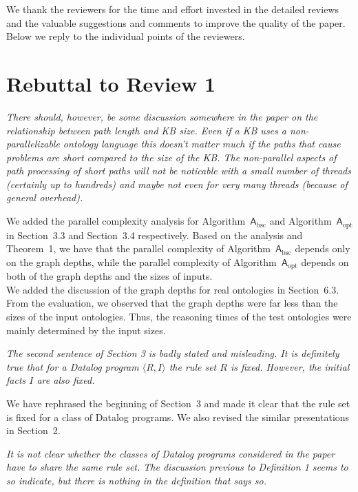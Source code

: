 \documentclass{article}
\let\quoteOld\quote
\let\endquoteOld\endquote
\renewenvironment{quote}{\quoteOld\itshape}{\endquoteOld}
\begin{document}
We thank the reviewers for the time and effort invested in the detailed reviews and the valuable suggestions and comments to improve the quality of the paper.  Below we reply to the individual points of the reviewers.


\section{Rebuttal to Review 1}

\begin{quote}
There should, however, be some discussion somewhere in the paper on the
relationship between path length and KB size.   Even if a KB uses a
non-parallelizable ontology language this doesn't matter much if the paths
that cause problems are short compared to the size of the KB.  The
non-parallel aspects of path processing of short paths will not be noticable
with a small number of threads (certainly up to hundreds) and maybe not even
for very many threads (because of general overhead).
\end{quote}

We added the parallel complexity analysis for Algorithm~$\mathsf{A}_{\text{bsc}}$
and Algorithm~$\mathsf{A}_{\text{opt}}$
in Section~3.3 and Section~3.4 respectively. 
Based on the analysis and Theorem~1, we have that the parallel complexity
of Algorithm~$\mathsf{A}_{\text{bsc}}$ depends only on the graph depths,
while the parallel complexity of Algorithm~$\mathsf{A}_{\text{opt}}$
depends on both of the graph depths and the sizes of inputs.\\

We added the discussion of the graph depths for real ontologies in Section~6.3.
From the evaluation, we observed that the graph depths were far less than
the sizes of the input ontologies. Thus, the reasoning times of the test ontologies
were mainly determined by the input sizes. 


\begin{quote}
  The second sentence of Section 3 is badly stated and misleading.  It is definitely true that for a Datalog program $\langle R, I \rangle$ the rule set $R$ is fixed.  However, the initial facts $I$ are also fixed.
\end{quote}

We have rephrased the beginning of Section~3 and made it clear that the rule set is fixed for a class of Datalog programs.
We also revised the similar presentations in Section~2.

\begin{quote}
It is not clear whether the classes of Datalog programs considered in the
paper have to share the same rule set.  The discussion previous to
Definition 1 seems to so indicate, but there is nothing in the definition
that says so.
\end{quote}
\end{document}
